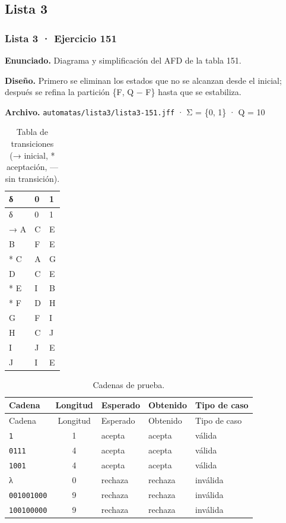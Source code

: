 
\hypertarget{lista-3}{%
\subsection{Lista 3}\label{lista-3}}

\hypertarget{lista-3-ejercicio-151}{%
\subsubsection{Lista 3 · Ejercicio 151}\label{lista-3-ejercicio-151}}

\textbf{Enunciado.} Diagrama y simplificación del AFD de la tabla 151.

\textbf{Diseño.} Primero se eliminan los estados que no se alcanzan desde el inicial; después se refina la partición \{F, Q − F\} hasta que se estabiliza.

\textbf{Archivo.} \texttt{automatas/lista3/lista3-151.jff} · Σ = \{0, 1\} · \textbar Q\textbar{} = 10

\begin{longtable}[]{@{}lll@{}}
\caption{Tabla de transiciones (→ inicial, * aceptación, --- sin transición).}\tabularnewline
\toprule\noalign{}
δ & 0 & 1 \\
\midrule\noalign{}
\endfirsthead
\toprule\noalign{}
δ & 0 & 1 \\
\midrule\noalign{}
\endhead
\bottomrule\noalign{}
\endlastfoot
→ A & C & E \\
B & F & E \\
* C & A & G \\
D & C & E \\
* E & I & B \\
* F & D & H \\
G & F & I \\
H & C & J \\
I & J & E \\
J & I & E \\
\end{longtable}

\begin{longtable}[]{@{}lclll@{}}
\caption{Cadenas de prueba.}\tabularnewline
\toprule\noalign{}
Cadena & Longitud & Esperado & Obtenido & Tipo de caso \\
\midrule\noalign{}
\endfirsthead
\toprule\noalign{}
Cadena & Longitud & Esperado & Obtenido & Tipo de caso \\
\midrule\noalign{}
\endhead
\bottomrule\noalign{}
\endlastfoot
\texttt{1} & 1 & acepta & acepta & válida \\
\texttt{0111} & 4 & acepta & acepta & válida \\
\texttt{1001} & 4 & acepta & acepta & válida \\
λ & 0 & rechaza & rechaza & inválida \\
\texttt{001001000} & 9 & rechaza & rechaza & inválida \\
\texttt{100100000} & 9 & rechaza & rechaza & inválida \\
\end{longtable}


